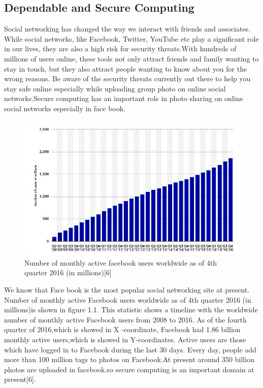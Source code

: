 \subsection[Dependable and Secure Computing]{Dependable and Secure Computing}
Social networking has changed the way we interact with friends and associates. While social networks, like Facebook, Twitter, YouTube etc play a significant role in our lives, they are also a high risk for security threats.With hundreds of millions of users online, these tools not only attract friends and family wanting to stay in touch, but they also attract people wanting to know about you for the wrong reasons. Be aware of the security threats currently out there to help you stay safe online especially while uploading group photo on online social networks.Secure computing has an important role in photo sharing  on online social networks especially in face book.
\begin{figure}[h!]
 \centering
  \includegraphics[scale=0.7]{fb.jpg}
  \caption[Number of Monthly Active Facebook Users World wide as of 4th Quarter 2016 (in millions)]{ Number of monthly active facebook users worldwide as of 4th quarter 2016 (in millions)[6]}
   \label{fg}
 
\end{figure}
\noindent
We know that Face book is the most popular social networking site at present. Number of monthly active Facebook users worldwide as of 4th quarter 2016 (in millions)is shown in figure 1.1. This statistic shows a timeline with the worldwide number of monthly active Facebook users from 2008 to 2016. As of the fourth quarter of 2016,which is showed in X -coordinate, Facebook had 1.86 billion monthly active users,which is showed in Y-coordinates. Active users are those which have logged in to Facebook during the last 30 days.  Every day, people add more than 100 million tags to photos on Facebook.At present around 350 billion photos are uploaded in facebook.so secure computing is an  important domain at present[6].

